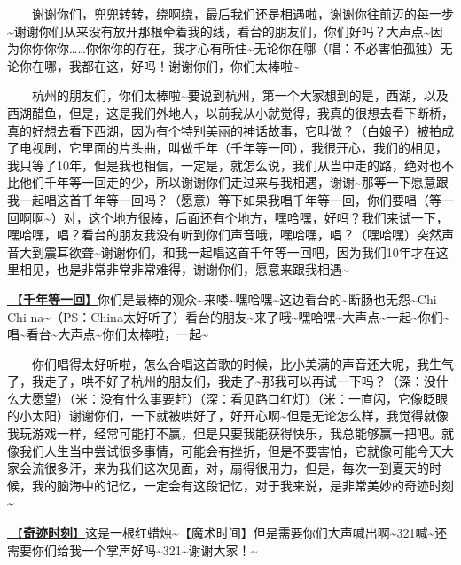 \documentclass[]{ctexbook}
\begin{document}
  谢谢你们，兜兜转转，绕啊绕，最后我们还是相遇啦，谢谢你往前迈的每一步\textasciitilde 谢谢你们从来没有放开那根牵着我的线，看台的朋友们，你们好吗？大声点\textasciitilde 因为你你你你\ldots\ldots 你你你的存在，我才心有所住\textasciitilde 无论你在哪（唱：不必害怕孤独）无论你在哪，我都在这，好吗！谢谢你们，你们太棒啦\textasciitilde{}

  杭州的朋友们，你们太棒啦\textasciitilde 要说到杭州，第一个大家想到的是，西湖，以及西湖醋鱼，但是，这是我们外地人，以前我从小就觉得，我真的很想去看下断桥，真的好想去看下西湖，因为有个特别美丽的神话故事，它叫做？（白娘子）被拍成了电视剧，它里面的片头曲，叫做千年（千年等一回），我很开心，我们的相见，我只等了10年，但是我也相信，一定是，就怎么说，我们从当中走的路，绝对也不比他们千年等一回走的少，所以谢谢你们走过来与我相遇，谢谢\textasciitilde 那等一下愿意跟我一起唱这首千年等一回吗？（愿意）等下如果我唱千年等一回，你们要唱（等一回啊啊\textasciitilde）对，这个地方很棒，后面还有个地方，嘿哈嘿，好吗？我们来试一下，嘿哈嘿，唱？看台的朋友我没有听到你们声音哦，嘿哈嘿，唱？（嘿哈嘿）突然声音大到震耳欲聋\textasciitilde 谢谢你们，和我一起唱这首千年等一回吧，因为我们10年才在这里相见，也是非常非常非常难得，谢谢你们，愿意来跟我相遇\textasciitilde{}

\hyperref[once-in-1000]{🎵【\textbf{千年等一回}】}你们是最棒的观众\textasciitilde 来喽\textasciitilde 嘿哈嘿\textasciitilde 这边看台的\textasciitilde 断肠也无怨\textasciitilde Chi Chi na\textasciitilde（PS：China太好听了）看台的朋友\textasciitilde 来了哦\textasciitilde 嘿哈嘿\textasciitilde 大声点\textasciitilde 一起\textasciitilde 你们\textasciitilde 唱\textasciitilde 看台\textasciitilde 大声点\textasciitilde 你们太棒啦，一起\textasciitilde{}

  你们唱得太好听啦，怎么合唱这首歌的时候，比小美满的声音还大呢，我生气了，我走了，哄不好了杭州的朋友们，我走了\textasciitilde 那我可以再试一下吗？（深：没什么大愿望）（米：没有什么事要赶）（深：看见路口红灯）（米：一直闪，它像眨眼的小太阳）谢谢你们，一下就被哄好了，好开心啊\textasciitilde 但是无论怎么样，我觉得就像我玩游戏一样，经常可能打不赢，但是只要我能获得快乐，我总能够赢一把吧。就像我们人生当中尝试很多事情，可能会有挫折，但是不要害怕，它就像可能今天大家会流很多汗，来为我们这次见面，对，扇得很用力，但是，每次一到夏天的时候，我的脑海中的记忆，一定会有这段记忆，对于我来说，是非常美妙的奇迹时刻\textasciitilde{}

\hyperref[magic-moment]{🎵【\textbf{奇迹时刻}】}这是一根红蜡烛\textasciitilde【魔术时间】但是需要你们大声喊出啊\textasciitilde321喊\textasciitilde 还需要你们给我一个掌声好吗\textasciitilde321\textasciitilde 谢谢大家！\textasciitilde{}
\end{document}
